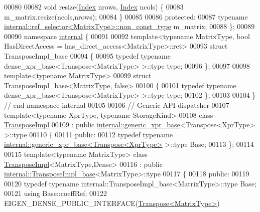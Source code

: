 \begin{DoxyCode}
00080 
00082     \textcolor{keywordtype}{void} resize(\hyperlink{namespace_eigen_a62e77e0933482dafde8fe197d9a2cfde}{Index} nrows, \hyperlink{namespace_eigen_a62e77e0933482dafde8fe197d9a2cfde}{Index} ncols) \{
00083       m\_matrix.resize(ncols,nrows);
00084     \}
00085 
00086   \textcolor{keyword}{protected}:
00087     \textcolor{keyword}{typename} \hyperlink{class_eigen_1_1internal_1_1_tensor_lazy_evaluator_writable}{internal::ref\_selector<MatrixType>::non\_const\_type}
       m\_matrix;
00088 \};
00089 
00090 \textcolor{keyword}{namespace }\hyperlink{namespaceinternal}{internal} \{
00091 
00092 template<typename MatrixType, bool HasDirectAccess = has\_direct\_access<MatrixType>::ret>
00093 \textcolor{keyword}{struct }TransposeImpl\_base
00094 \{
00095   \textcolor{keyword}{typedef} \textcolor{keyword}{typename} dense\_xpr\_base<Transpose<MatrixType> >::type type;
00096 \};
00097 
00098 \textcolor{keyword}{template}<\textcolor{keyword}{typename} MatrixType>
00099 \textcolor{keyword}{struct }TransposeImpl\_base<MatrixType, false>
00100 \{
00101   \textcolor{keyword}{typedef} \textcolor{keyword}{typename} dense\_xpr\_base<Transpose<MatrixType> >::type type;
00102 \};
00103 
00104 \} \textcolor{comment}{// end namespace internal}
00105 
00106 \textcolor{comment}{// Generic API dispatcher}
00107 \textcolor{keyword}{template}<\textcolor{keyword}{typename} XprType, \textcolor{keyword}{typename} StorageKind>
00108 \textcolor{keyword}{class }\hyperlink{class_eigen_1_1_transpose_impl}{TransposeImpl}
00109   : \textcolor{keyword}{public} \hyperlink{struct_eigen_1_1internal_1_1generic__xpr__base}{internal::generic\_xpr\_base}<Transpose<XprType> >::type
00110 \{
00111 \textcolor{keyword}{public}:
00112   \textcolor{keyword}{typedef} \textcolor{keyword}{typename} \hyperlink{struct_eigen_1_1internal_1_1generic__xpr__base}{internal::generic\_xpr\_base<Transpose<XprType>}
       >::type Base;
00113 \};
00114 
00115 \textcolor{keyword}{template}<\textcolor{keyword}{typename} MatrixType> \textcolor{keyword}{class }\hyperlink{class_eigen_1_1_transpose_impl}{TransposeImpl}<MatrixType,Dense>
00116   : \textcolor{keyword}{public} \hyperlink{struct_eigen_1_1internal_1_1_transpose_impl__base}{internal::TransposeImpl\_base}<MatrixType>::type
00117 \{
00118   \textcolor{keyword}{public}:
00119 
00120     \textcolor{keyword}{typedef} \textcolor{keyword}{typename} internal::TransposeImpl\_base<MatrixType>::type Base;
00121     \textcolor{keyword}{using} Base::coeffRef;
00122     EIGEN\_DENSE\_PUBLIC\_INTERFACE(\hyperlink{group___core___module_class_eigen_1_1_transpose}{Transpose<MatrixType>})

\end{DoxyCode}
